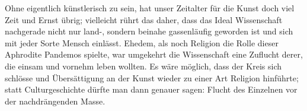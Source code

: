 Ohne eigentlich künstlerisch zu sein, hat unser Zeitalter für die Kunst doch viel Zeit und Ernst übrig; vielleicht rührt das daher, dass das Ideal Wissenschaft nachgerade nicht nur land-, sondern beinahe gassenläufig geworden ist und sich mit jeder Sorte Mensch einlässt. Ehedem, als noch Religion die Rolle dieser Aphrodite Pandemos spielte, war umgekehrt die Wissenschaft eine Zuflucht derer, die einsam und vornehm leben wollten. Es wäre möglich, dass der Kreis sich schlösse und Übersättigung an der Kunst wieder zu einer Art Religion hinführte; statt Culturgeschichte dürfte man dann genauer sagen: Flucht des Einzelnen vor der nachdrängenden Masse.
\par

